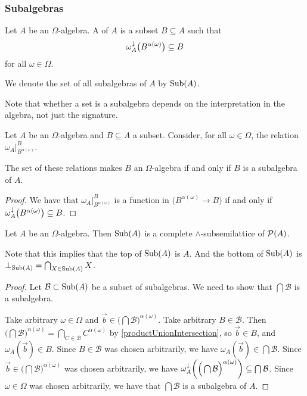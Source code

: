 \subsubsection{Subalgebras}
\begin{definition}
Let $A$ be an $\Omega$-algebra. A  of $A$ is a subset $B\subseteq A$ such that
\[ \omega_A^{\downarrow}\big(B^{\alpha(\omega)}\big) \subseteq B \]
for all $\omega \in \Omega$.

We denote the set of all subalgebras of $A$ by $\operatorname{Sub}(A)$.
\end{definition}
Note that whether a set is a subalgebra depends on the interpretation in the algebra, not just the signature.

\begin{proposition}
Let $A$ be an $\Omega$-algebra and $B\subseteq A$ a subset. Consider, for all $\omega\in \Omega$, the relation $\omega_A|_{B^{\alpha(\omega)}}^B$.

The set of these relations makes $B$ an $\Omega$-algebra \textup{if and only if} $B$ is a subalgebra of $A$.
\end{proposition}
\begin{proof}
We have that $\omega_A|_{B^{\alpha(\omega)}}^B$ is a function in $\big(B^{\alpha(\omega)} \to B\big)$ if and only if $\omega_A^{\downarrow}\big(B^{\alpha(\omega)}\big) \subseteq B$.
\end{proof}

\begin{proposition}
Let $A$ be an $\Omega$-algebra. Then $\operatorname{Sub}(A)$ is a complete $\wedge$-subsemilattice of $\operatorname{\mathcal{P}}(A)$.
\end{proposition}
Note that this implies that the top of $\operatorname{Sub}(A)$ is $A$. And the bottom of $\operatorname{Sub}(A)$ is $\bot_{\operatorname{Sub}(A)} = \bigcap_{X\in \operatorname{Sub}(A)}X$.
\begin{proof}
Let $\mathcal{B} \subset \operatorname{Sub}(A)$ be a subset of subalgebras. We need to show that $\bigcap \mathcal{B}$ is a subalgebra.

Take arbitrary $\omega\in \Omega$ and $\vec{b}\in \Big(\bigcap \mathcal{B}\Big)^{\alpha(\omega)}$. Take arbitrary $B\in \mathcal{B}$. Then $\Big(\bigcap \mathcal{B}\Big)^{\alpha(\omega)} = \bigcap_{C\in\mathcal{B}}C^{\alpha(\omega)}$ by \ref{productUnionIntersection}, so $\vec{b}\in B$, and $\omega_A(\vec{b}) \in B$. Since $B\in \mathcal{B}$ was chosen arbitrarily, we have $\omega_A(\vec{b}) \in \bigcap\mathcal{B}$. Since $\vec{b}\in \Big(\bigcap \mathcal{B}\Big)^{\alpha(\omega)}$ was chosen arbitrarily, we have $\omega_A^\downarrow\bigg(\Big(\bigcap \mathcal{B}\Big)^{\alpha(\omega)}\bigg) \subseteq \bigcap\mathcal{B}$. Since $\omega\in\Omega$ was chosen arbitrarily, we have that $\bigcap\mathcal{B}$ is a subalgebra of $A$.
\end{proof}

